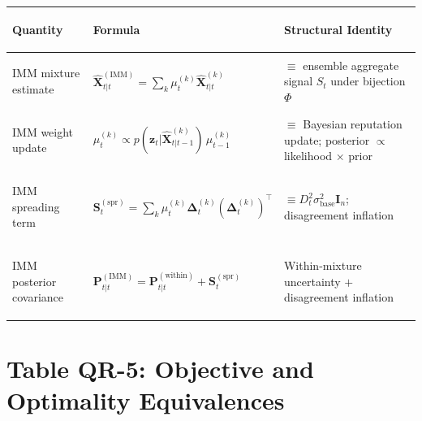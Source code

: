 \documentclass[12pt,openany]{book}
\numberwithin{equation}{chapter}
\theoremstyle{plain}
\theoremstyle{definition}
\theoremstyle{remark}
\renewcommand{\arraystretch}{1.2}
\begin{document}
\begin{center}
\small
\renewcommand{\arraystretch}{1.40}
\begin{tabularx}{\linewidth}{@{}
  >{\bfseries\raggedright\arraybackslash}p{3.2cm}
  >{\raggedright\arraybackslash}p{4.6cm}
  >{\raggedright\arraybackslash}X
@{}}
\toprule
Quantity & Formula & Structural Identity \\
\midrule
IMM mixture estimate &
$\hat{\mathbf{X}}_{t|t}^{(\mathrm{IMM})} = \sum_k \mu_t^{(k)}\hat{\mathbf{X}}_{t|t}^{(k)}$ &
$\equiv$ ensemble aggregate signal $S_t$ under bijection $\Phi$ \\
IMM weight update &
$\mu_t^{(k)}\propto p(\mathbf{z}_t|\hat{\mathbf{X}}_{t|t-1}^{(k)})\,\mu_{t-1}^{(k)}$ &
$\equiv$ Bayesian reputation update; posterior $\propto$ likelihood $\times$ prior \\
IMM spreading term &
$\mathbf{S}_t^{(\mathrm{spr})} = \sum_k\mu_t^{(k)}\boldsymbol{\Delta}_t^{(k)}(\boldsymbol{\Delta}_t^{(k)})^\top$ &
$\equiv D_t^2\sigma_{\mathrm{base}}^2\mathbf{I}_n$; disagreement inflation \\
IMM posterior covariance &
$\mathbf{P}_{t|t}^{(\mathrm{IMM})} = \mathbf{P}_{t|t}^{(\mathrm{within})} + \mathbf{S}_t^{(\mathrm{spr})}$ &
Within-mixture uncertainty $+$ disagreement inflation \\
\bottomrule
\end{tabularx}
\end{center}

\section*{Table QR-5: Objective and Optimality Equivalences}
\end{document}
